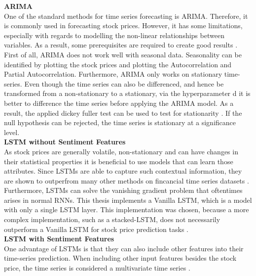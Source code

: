 \documentclass[11pt, a4paper]{article}
\begin{document}
\noindent\textbf{ARIMA}\\
One of the standard methods for time series forecasting is ARIMA. Therefore, it is commonly used in forecasting stock prices.
However, it has some limitations, especially with regards to modelling the non-linear relationships between variables. As a result,
some prerequisites are required to create good results \citep{sima2018timeseries}.
First of all, ARIMA does not work well with seasonal data. Seasonality can be identified by plotting the stock prices and plotting
the Autocorrelation and Partial Autocorrelation.
Furthermore, ARIMA only works on stationary time-series. Even though the time series can also be differenced, and hence be transformed from
a non-stationary to a stationary, via the hyperparameter d it is better to difference the time series before applying the ARIMA model.
As a result, the applied dickey fuller test can be used to test for stationarity \citep{jain2017ASO}. If the null hypothesis can be rejected, the time series is stationary at a significance level. \\

\noindent\textbf{LSTM without Sentiment Features}\\
As stock prices are generally volatile, non-stationary and can have changes in their statistical properties it is beneficial to use
models that can learn those attributes. Since LSTMs are able to capture such contextual information, they are shown to outperfrom many other methods
on fincancial time series datasets \citep{preeti2019lstm}. Furthermore, LSTMs can solve the vanishing gradient problem that oftentimes arises in
normal RNNs. This thesis implements a Vanilla LSTM, which is a model with only a single LSTM layer. This implementation was chosen, because a more complex
implementation, such as a stacked-LSTM, does not necessarily outperform a Vanilla LSTM for stock price prediction tasks \citep{hai2020lstms}. \\

\noindent\textbf{LSTM with Sentiment Features}\\
One advantage of LSTMs is that they can also include other features into their time-series prediction.
When including other input features besides the stock price, the time series is considered a multivariate time series \citep{liu2019multivariate}. \\
\end{document}
